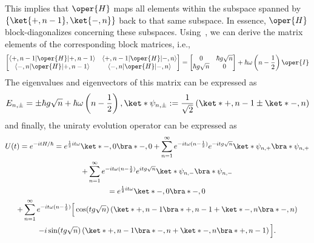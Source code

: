 This implies that \( \oper{H} \) maps all elements within the subspace spanned
by \\
\( \{ \ket{+, n - 1}, \ket{-, n} \} \) back to that same subspace.
In essence, \( \oper{H} \) block-diagonalizes concerning these subspaces. 
Using~, we can derive the matrix elements of the 
corresponding block matrices, i.e., 
\begin{equation}
\label{eq:appen_JCM_block_matrix}
\begin{bmatrix}
\langle +, n - 1 \lvert \oper{H} \lvert +, n - 1 \rangle & \langle +, n - 1 \lvert \oper{H} \lvert -, n \rangle \\
\langle -, n \lvert \oper{H} \lvert +, n - 1 \rangle & \langle -, n \lvert \oper{H} 
\lvert -, n \rangle \\
\end{bmatrix}
= 
\begin{bmatrix}
0 & \hbar g \sqrt{n} \\
\hbar g \sqrt{n} & 0 \\
\end{bmatrix}
+ \hbar \omega \left( n - \frac{1}{2} \right) \oper{I}
\end{equation}
The eigenvalues and eigenvectors of this matrix can be expressed as 
\begin{equation}
    \label{eq:appen_JCM_block_eigenvalues}
    E_{n,\pm} = \pm \hbar g \sqrt{n} + \hbar \omega \left( n - \frac{1}{2} \right),  
     \ket*{\psi_{n,\pm}} := \frac{1}{\sqrt{2}} 
     \left( \ket*{+, n - 1} \pm \ket*{-, n} \right)
\end{equation}
and finally, the uniraty evolution operator can be expressed as
\begin{eqnarray}
    \begin{gathered}
        U(t) = e^{-i t H/\hbar} = e^{\frac{1}{2} i t \omega } 
        \ket*{-, 0}\bra*{-, 0} + \sum_{n=1}^{\infty} e^{-i t \omega (n - \frac{1}{2})} e^{-i t g \sqrt{n}} \ket*{\psi_{n,+}}\bra*{\psi_{n,+}} \\
     + \sum_{n=1}^{\infty} e^{-i t \omega (n - \frac{1}{2})} e^{i t g \sqrt{n}} \ket*{\psi_{n,-}}\bra*{\psi_{n,-}} \\
    = e^{\frac{1}{2} i t \omega }\ket*{-, 0}\bra*{-, 0} \\
     + \sum_{n=1}^{\infty} e^{-i t \omega (n - \frac{1}{2})} \Big[ \cos(t g \sqrt{n}) \left( \ket*{+, n - 1}\bra*{+, n - 1} + \ket*{-, n}\bra*{-, n} \right) \\
     - i \sin(t g \sqrt{n}) \left( \ket*{+, n - 1}\bra*{-, n} + \ket*{-, n}\bra*{+, n - 1} \right) \Big].
    \end{gathered}
\end{eqnarray}

